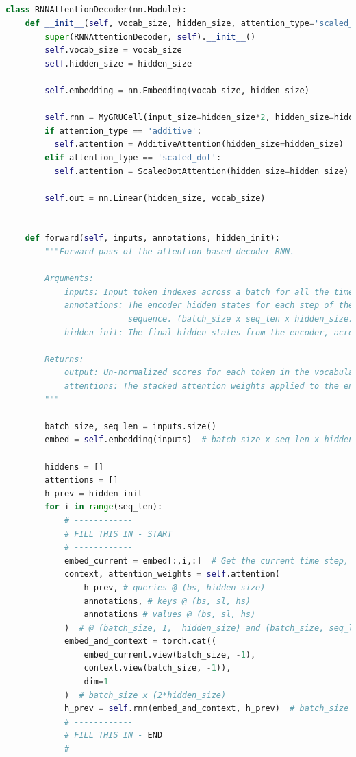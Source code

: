 \documentclass{article}
\begin{document}
	\subsection{}
\begin{lstlisting}[language=python]
class RNNAttentionDecoder(nn.Module):
    def __init__(self, vocab_size, hidden_size, attention_type='scaled_dot'):
        super(RNNAttentionDecoder, self).__init__()
        self.vocab_size = vocab_size
        self.hidden_size = hidden_size

        self.embedding = nn.Embedding(vocab_size, hidden_size)

        self.rnn = MyGRUCell(input_size=hidden_size*2, hidden_size=hidden_size)
        if attention_type == 'additive':
          self.attention = AdditiveAttention(hidden_size=hidden_size)
        elif attention_type == 'scaled_dot':
          self.attention = ScaledDotAttention(hidden_size=hidden_size)
        
        self.out = nn.Linear(hidden_size, vocab_size)

        
    def forward(self, inputs, annotations, hidden_init):
        """Forward pass of the attention-based decoder RNN.

        Arguments:
            inputs: Input token indexes across a batch for all the time step. (batch_size x decoder_seq_len)
            annotations: The encoder hidden states for each step of the input.
                         sequence. (batch_size x seq_len x hidden_size)
            hidden_init: The final hidden states from the encoder, across a batch. (batch_size x hidden_size)

        Returns:
            output: Un-normalized scores for each token in the vocabulary, across a batch for all the decoding time steps. (batch_size x decoder_seq_len x vocab_size)
            attentions: The stacked attention weights applied to the encoder annotations (batch_size x encoder_seq_len x decoder_seq_len)
        """
        
        batch_size, seq_len = inputs.size()
        embed = self.embedding(inputs)  # batch_size x seq_len x hidden_size        

        hiddens = []
        attentions = []
        h_prev = hidden_init
        for i in range(seq_len):
            # ------------
            # FILL THIS IN - START
            # ------------
            embed_current = embed[:,i,:]  # Get the current time step, across the whole batch
            context, attention_weights = self.attention(
                h_prev, # queries @ (bs, hidden_size)
                annotations, # keys @ (bs, sl, hs)
                annotations # values @ (bs, sl, hs)
            )  # @ (batch_size, 1,  hidden_size) and (batch_size, seq_len, 1)
            embed_and_context = torch.cat((
                embed_current.view(batch_size, -1),
                context.view(batch_size, -1)),
                dim=1
            )  # batch_size x (2*hidden_size) 
            h_prev = self.rnn(embed_and_context, h_prev)  # batch_size x hidden_size 
            # ------------
            # FILL THIS IN - END
            # ------------    
            

\end{lstlisting}
\end{document}
